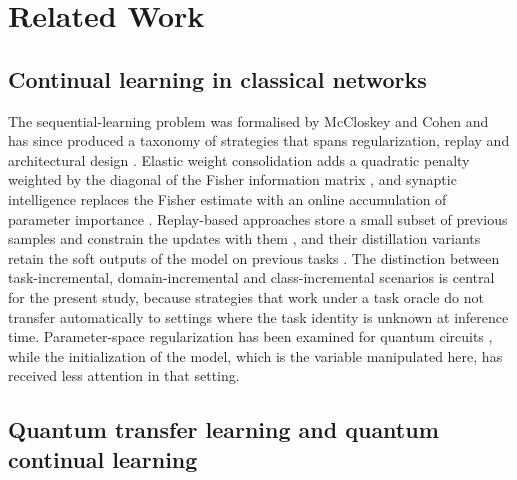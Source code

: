 \documentclass[preprint,number,sort&compress]{elsarticle}
\begin{document}
\section{Related Work}
\label{sec:related}

\subsection{Continual learning in classical networks}

The sequential-learning problem was formalised by
McCloskey and Cohen \cite{McCloskey89} and has since produced
a taxonomy of strategies that spans regularization, replay and architectural
design \cite{parisi2019continual, Lange22, Wang24}. Elastic weight
consolidation adds a quadratic penalty weighted by the diagonal of the
Fisher information matrix \cite{kirkpatrick2017overcoming}, and synaptic
intelligence replaces the Fisher estimate with an online accumulation of
parameter importance \cite{Zenke17}. Replay-based approaches
store a small subset of previous samples and constrain the updates with
them \cite{lopezpaz2017gem}, and their distillation variants retain the soft
outputs of the model on previous tasks \cite{buzzega2020dark, Li18}. The
distinction between task-incremental, domain-incremental and
class-incremental scenarios \cite{Ven22} is central for the present study,
because strategies that work under a task oracle do not transfer
automatically to settings where the task identity is unknown at inference
time. Parameter-space regularization has been examined for quantum circuits
\cite{martinperez2026derpp}, while the initialization of the model, which is
the variable manipulated here, has received less attention in that setting.

\subsection{Quantum transfer learning and quantum continual learning}
\end{document}

